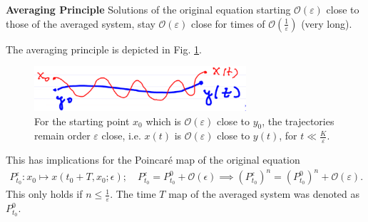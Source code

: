 \begin{framed}
	\noindent
	\textbf{Averaging Principle} Solutions of the original equation starting $\mathcal{O}(\varepsilon)$ close to those of the averaged system, stay $\mathcal{O}(\varepsilon)$ close for times of $\mathcal{O}\left(\frac{1}{\varepsilon}\right)$ (very long).
\end{framed}

The averaging principle is depicted in Fig. \ref{fig:avg_principle}.
\begin{figure}[h!]
	\centering
	\includegraphics[width=0.7\textwidth]{figures/ch5/3avg_principle.png}
	\caption{For the starting point $x_0$ which is $\mathcal{O}(\varepsilon)$ close to $y_0$, the trajectories remain order $\varepsilon$ close, i.e. $x(t)$ is $\mathcal{O}(\varepsilon)$ close to $y(t)$, for $t \ll \frac{K}{\varepsilon}$.}
	\label{fig:avg_principle}
\end{figure}

This has implications for the Poincaré map of the original equation
\begin{align}
	P_{t_0}^{\varepsilon}:x_0 \mapsto x(t_0+T, x_0; \epsilon);\quad P_{t_0}^{\varepsilon} = P_{t_0}^{0} + \mathcal{O}(\epsilon) \implies \left( P_{t_0}^{\varepsilon}\right)^{n} = \left( P_{t_0}^{0}\right)^{n} + \mathcal{O}(\varepsilon).
\end{align}
This only holds if $n \leq \frac{1}{\varepsilon}$. The time $T$ map of the averaged system was denoted as $P_{t_0}^{0}$.

